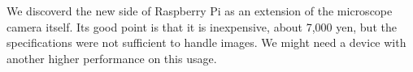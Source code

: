 We discoverd the new side of Raspberry Pi as an extension of the microscope camera itself. Its good point is that it is inexpensive, about 7,000 yen, but the specifications were not sufficient to handle images. We might need a device with another higher performance on this usage.

